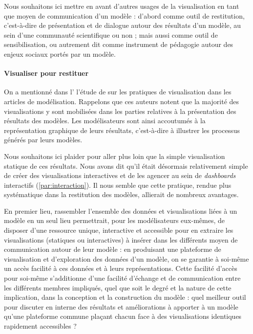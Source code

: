 \documentclass[a4paper, 12pt]{article}
\begin{document}
Nous souhaitons ici mettre en avant d'autres usages de la visualisation en tant que moyen de communication d'un modèle : d'abord comme outil de restitution, c'est-à-dire de présentation et de dialogue autour des résultats d'un modèle, au sein d'une communauté scientifique ou non ; mais aussi comme outil de sensibilisation, ou autrement dit comme instrument de pédagogie autour des enjeux sociaux portés par un modèle.

\paragraph{Visualiser pour restituer}

On a mentionné dans l' l'étude de \textcite{angus_anarchy_2015} sur les pratiques de visualisation dans les articles de modélisation. Rappelons que ces auteurs notent que la majorité des visualisations y sont mobilisées dans les parties relatives à la présentation des résultats des modèles.
Les modélisateurs sont ainsi accoutumés à la représentation graphique de leurs résultats, c'est-à-dire à illustrer les processus générés par leurs modèles.

Nous souhaitons ici plaider pour aller plus loin que la simple visualisation statique de ces résultats. Nous avons dit qu'il était désormais relativement simple de créer des visualisations interactives et de les agencer au sein de \textit{dashboards} interactifs (\cref{par:interaction}).
Il nous semble que cette pratique, rendue plus systématique dans la restitution des modèles, allierait de nombreux avantages.

En premier lieu, rassembler l'ensemble des données et visualisations liées à un modèle en un seul lieu permettrait, pour les modélisateurs eux-mêmes, de disposer d'une ressource unique, interactive et accessible pour en extraire les visualisations (statiques ou interactives) à insérer dans les différents moyen de communication autour de leur modèle : en produisant une plateforme de visualisation et d'exploration des données d'un modèle, on se garantie à soi-même un accès facilité à ces données et à leurs représentations.
Cette facilité d'accès pour soi-même s'additionne d'une facilité d'échange et de communication entre les différents membres impliqués, quel que soit le degré et la nature de cette implication, dans la conception et la construction du modèle : quel meilleur outil pour discuter en interne des résultats et améliorations à apporter à un modèle qu'une plateforme commune plaçant chacun face à des visualisations identiques rapidement accessibles ?
\end{document}
